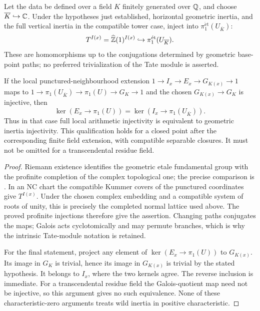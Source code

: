 \begin{corollary}\label{P3b-profinite}
Let the data be defined over a field $K$ finitely generated over
$\mathbb Q$, and choose $\overline K\hookrightarrow\mathbb C$. Under the
hypotheses just established, horizontal geometric inertia,
and the full vertical inertia in the compatible tower case,
inject into $\pi _1^{\mathrm{\acute et}}(U_{\overline K})$:
\[
 T^{I(x)}=\widehat{\mathbb Z}(1)^{I(x)}
       \hookrightarrow\pi _1^{\mathrm{\acute et}}(U_{\overline K}).
\]
These are homomorphisms up to the conjugations determined by
geometric base-point paths; no preferred trivialization of
the Tate module is asserted.

If the local punctured-neighbourhood extension
$1\to I_x\to E_x\to G_{K(x)}\to1$ maps to
$1\to\pi _1(U_{\overline K})\to\pi _1(U)\to G_K\to1$
and the chosen $G_{K(x)}\to G_K$ is injective, then
\[
 \ker(E_x\to\pi _1(U))
 =\ker(I_x\to\pi _1(U_{\overline K})).
\]
Thus in that case full local arithmetic injectivity is
equivalent to geometric inertia injectivity. This qualification
holds for a closed point after the corresponding finite field
extension, with compatible separable closures. It must not
be omitted for a transcendental residue field.
\end{corollary}
\begin{proof}
Riemann existence identifies the geometric etale fundamental
group with the profinite completion of the complex topological
one; the precise comparison is
\citet[Exposé XII, Théorème 5.1 and Corollaire 5.2]{SGA1}.
In an NC chart the compatible Kummer covers of the punctured
coordinates give $T^{I(x)}$. Under the chosen complex embedding
and a compatible system of roots of unity, this is precisely
the completed normal lattice used above. The proved profinite
injections therefore give the assertion. Changing paths
conjugates the maps; Galois acts cyclotomically and may permute
branches, which is why the intrinsic Tate-module notation is
retained.

For the final statement, project any element of
$\ker(E_x\to\pi _1(U))$ to $G_{K(x)}$. Its image in $G_K$ is
trivial, hence its image in $G_{K(x)}$ is trivial by the stated
hypothesis. It belongs to $I_x$, where the two kernels agree.
The reverse inclusion is immediate. For a transcendental
residue field the Galois-quotient map need not be injective,
so this argument gives no such equivalence. None of these
characteristic-zero arguments treats wild inertia in positive
characteristic.
\end{proof}

